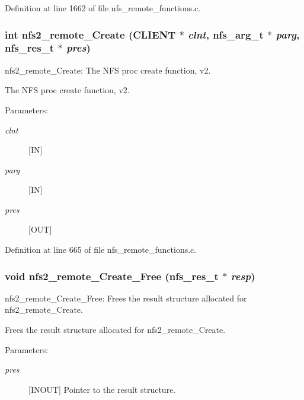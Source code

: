Definition at line 1662 of file nfs\_\-remote\_\-functions.c.
\subsubsection[{nfs2\_\-remote\_\-Create}]{\setlength{\rightskip}{0pt plus 5cm}int nfs2\_\-remote\_\-Create (CLIENT $\ast$ {\em clnt}, \/  nfs\_\-arg\_\-t $\ast$ {\em parg}, \/  nfs\_\-res\_\-t $\ast$ {\em pres})}\label{group__NFSprocs_g799f2a241ac2d82c0c338126c0e66561}


nfs2\_\-remote\_\-Create: The NFS proc create function, v2.

The NFS proc create function, v2.

\begin{Desc}
\item[Parameters:]
\begin{description}
\item[{\em clnt}][IN] \item[{\em parg}][IN] \item[{\em pres}][OUT] \end{description}
\end{Desc}


Definition at line 665 of file nfs\_\-remote\_\-functions.c.
\subsubsection[{nfs2\_\-remote\_\-Create\_\-Free}]{\setlength{\rightskip}{0pt plus 5cm}void nfs2\_\-remote\_\-Create\_\-Free (nfs\_\-res\_\-t $\ast$ {\em resp})}\label{group__NFSprocs_gc7be9ac59838a3d6c5decadfdd55e88c}


nfs2\_\-remote\_\-Create\_\-Free: Frees the result structure allocated for nfs2\_\-remote\_\-Create.

Frees the result structure allocated for nfs2\_\-remote\_\-Create.

\begin{Desc}
\item[Parameters:]
\begin{description}
\item[{\em pres}][INOUT] Pointer to the result structure. \end{description}
\end{Desc}


